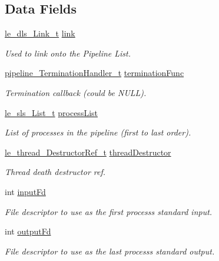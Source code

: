 \subsection*{Data Fields}
\begin{DoxyCompactItemize}
\item 
\hyperlink{structle__dls___link__t}{le\+\_\+dls\+\_\+\+Link\+\_\+t} \hyperlink{struct_pipeline__t_a538886a22d5ef9fde1f79055a9fa4725}{link}
\begin{DoxyCompactList}\small\item\em Used to link onto the Pipeline List. \end{DoxyCompactList}\item 
\hyperlink{pipeline_8h_a768a6dc8deffe73dcd6a7a30696a23e9}{pipeline\+\_\+\+Termination\+Handler\+\_\+t} \hyperlink{struct_pipeline__t_adb79284216c6f46b525940cb03acd152}{termination\+Func}
\begin{DoxyCompactList}\small\item\em Termination callback (could be N\+U\+LL). \end{DoxyCompactList}\item 
\hyperlink{structle__sls___list__t}{le\+\_\+sls\+\_\+\+List\+\_\+t} \hyperlink{struct_pipeline__t_a9eeb31f6a75389c90b3c06a77e4710c6}{process\+List}
\begin{DoxyCompactList}\small\item\em List of processes in the pipeline (first to last order). \end{DoxyCompactList}\item 
\hyperlink{le__thread_8h_a738918131ea45ff37440858db2cec7db}{le\+\_\+thread\+\_\+\+Destructor\+Ref\+\_\+t} \hyperlink{struct_pipeline__t_ad3dc80b5169a7dead64a6346abc65436}{thread\+Destructor}
\begin{DoxyCompactList}\small\item\em Thread death destructor ref. \end{DoxyCompactList}\item 
int \hyperlink{struct_pipeline__t_aaea86857b99c0cb856e77284bc125b05}{input\+Fd}
\begin{DoxyCompactList}\small\item\em File descriptor to use as the first process\textquotesingle{}s standard input. \end{DoxyCompactList}\item 
int \hyperlink{struct_pipeline__t_a769458a0d2dcad58d0f9e6910c6743f8}{output\+Fd}
\begin{DoxyCompactList}\small\item\em File descriptor to use as the last process\textquotesingle{}s standard output. \end{DoxyCompactList}\item 

\end{DoxyCompactItemize}
